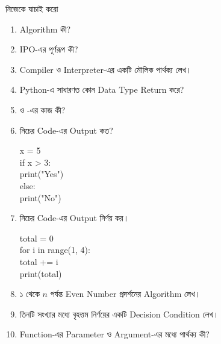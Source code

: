 \begin{revisionbox}{নিজেকে যাচাই করো}

\begin{enumerate}

\item Algorithm কী?

\item IPO-এর পূর্ণরূপ কী?

\item Compiler ও Interpreter-এর একটি মৌলিক পার্থক্য লেখ।

\item Python-এ  সাধারণত কোন Data Type Return করে?

\item {} ও -এর কাজ কী?

\item নিচের Code-এর Output কত?

\begin{english}
\ttfamily
x = 5\\[0.5mm]
if x > 3:\\
\hspace*{4mm}print("Yes")\\
else:\\
\hspace*{4mm}print("No")
\end{english}

\item নিচের Code-এর Output নির্ণয় কর।

\begin{english}
\ttfamily
total = 0\\[0.5mm]
for i in range(1, 4):\\
\hspace*{4mm}total += i\\[0.5mm]
print(total)
\end{english}

\item ১ থেকে \(n\) পর্যন্ত Even Number প্রদর্শনের Algorithm লেখ।

\item তিনটি সংখ্যার মধ্যে বৃহত্তম নির্ণয়ের একটি Decision Condition লেখ।

\item Function-এর Parameter ও Argument-এর মধ্যে পার্থক্য কী?

\end{enumerate}

\end{revisionbox}


